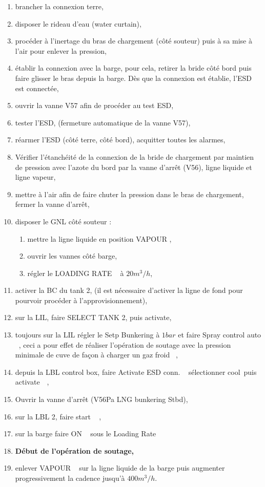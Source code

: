 \documentclass[12pt,a4paper]{article}
\newcommand{\gui}[1]
{\og #1 \fg~}
\begin{document}
\begin{enumerate}
 \item brancher la connexion terre,
 \item disposer le rideau d'eau (water curtain),
 \item procéder à l'inertage du bras de chargement (côté souteur) puis à sa mise à l'air pour enlever la pression,
 \item établir la connexion avec la barge, pour cela, retirer la bride côté bord puis faire glisser le bras depuis la barge. Dès que la connexion est 
établie, l'ESD est connectée,
    \item ouvrir la vanne V57 afin de procéder au test ESD,
 \item tester l'ESD, (fermeture automatique de la vanne V57),
\item réarmer l'ESD (côté terre, côté bord), acquitter toutes les alarmes, 
 \item Vérifier l'étanchéité de la connexion de la bride de chargement par maintien de pression avec l'azote du bord par la vanne d'arrêt (V56), ligne liquide et ligne vapeur,
 \item mettre à l'air afin de faire chuter la pression dans le bras de chargement, fermer la vanne d'arrêt,
 \item disposer le GNL côté souteur : 
 \begin{enumerate}
  \item mettre la ligne liquide en position \og VAPOUR \fg,
  \item ouvrir les vannes côté barge, 
  \item régler le \og LOADING RATE \fg~ à $20 m^3/h$,
 \end{enumerate}

 \item activer la BC du tank 2, (il est nécessaire d'activer la ligne de fond pour pourvoir procéder à l'approvisionnement),
 \item sur la LIL, faire SELECT TANK 2, puis activate, 
 \item toujours sur la LIL régler le Setp Bunkering à $1 bar$ et faire \gui{Spray control auto}, ceci a pour effet de réaliser l'opération de soutage avec la pression minimale de cuve de façon à charger un gaz \gui{froid},
 \item depuis la LBL control box, faire \gui{Activate ESD conn.} sélectionner \og cool~\fg puis \og activate~\fg~,
 \item Ouvrir la vanne d'arrêt (V56Pa LNG bunkering Stbd),
 \item sur la LBL 2, faire \gui{start} ,
 \item sur la barge faire \gui{ON} sous le \gui{Loading Rate}
 \item \textbf{Début de l'opération de soutage,}
 \item enlever \gui{VAPOUR} sur la ligne liquide de la barge puis augmenter progressivement la cadence jusqu'à $400 m^3/h$.
\end{enumerate}
\end{document}
